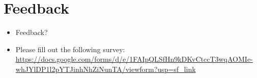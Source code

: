 \section{Feedback}
\begin{frame}
  \begin{itemize}
    \item Feedback?
    \item Please fill out the following survey: \url{https://docs.google.com/forms/d/e/1FAIpQLSfHn9kDKvCtccT3wqAOMIe-whJYlDP1l2pYTJinhNhZiNunTA/viewform?usp=sf_link}
    \end{itemize}
\end{frame}